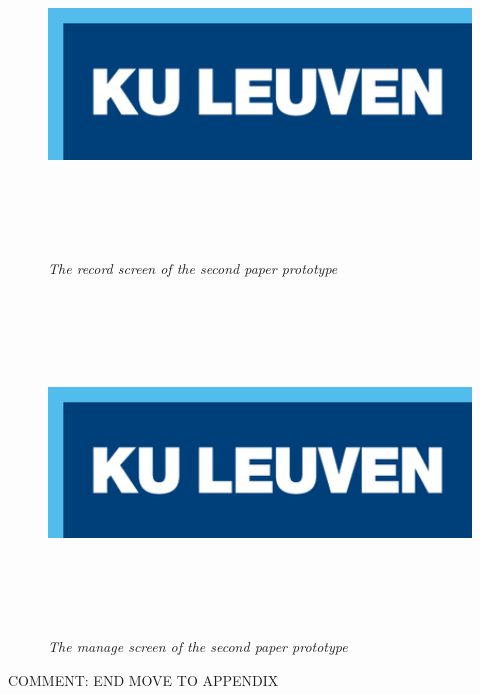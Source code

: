 \begin{figure}[H]
	\begin{center}
		\includegraphics[width=16cm, height=9cm]{KUL.png}
		\caption{\emph{The record screen of the second paper prototype}}
		\label{The first paper prototype}
	\end{center}
\end{figure}

\begin{figure}[H]
	\begin{center}
		\includegraphics[width=16cm, height=9cm]{KUL.png}
		\caption{\emph{The manage screen of the second paper prototype}}
		\label{The first paper prototype}
	\end{center}
\end{figure}

{\large COMMENT: END MOVE TO APPENDIX}

